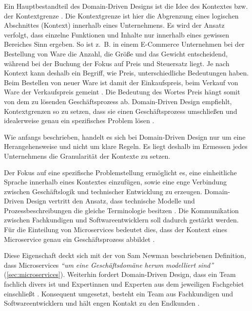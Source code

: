 Ein Hauptbestandteil des Domain-Driven Designs ist die Idee des Kontextes bzw. der Kontextgrenze \parencite[vgl.][]{fowler_boundedContext_2014}. Die Kontextgrenze ist hier die Abgrenzung eines logischen Abschnittes (Kontext) innerhalb eines Unternehmens. Es wird der Ansatz verfolgt, dass einzelne Funktionen und Inhalte nur innerhalb eines gewissen Bereiches Sinn ergeben. So ist z.~B. in einem E-Commerce Unternehmen bei der Bestellung von Ware die Anzahl, die Größe und das Gewicht entscheidend, während bei der Buchung der Fokus auf Preis und Steuersatz liegt. Je nach Kontext kann deshalb ein Begriff, wie Preis, unterschiedliche Bedeutungen haben. Beim Bestellen von neuer Ware ist damit der Einkaufspreis, beim Verkauf von Ware der Verkaufspreis gemeint \parencite[vgl.][S. 24 ff.]{evans_domain-driven_2003}. Die Bedeutung des Wortes Preis hängt somit von dem zu lösenden Geschäftsprozess ab. Domain-Driven Design empfiehlt, Kontextgrenzen so zu setzen, dass sie einen Geschäftsprozess umschließen und idealerweise genau ein spezifisches Problem lösen \parencite[vgl.][Kap. 4.3]{wolff_microservices_2018}.

Wie anfangs beschrieben, handelt es sich bei Domain-Driven Design nur um eine Herangehensweise und nicht um klare Regeln. Es liegt deshalb im Ermessen jedes Unternehmens die Granularität der Kontexte zu setzen.

Der Fokus auf eine spezifische Problemstellung ermöglicht es, eine einheitliche Sprache innerhalb eines Kontextes einzufügen, sowie eine enge Verbindung zwischen Geschäftslogik und technischer Entwicklung zu erzeugen. Domain-Driven Design vertritt den Ansatz, dass technische Modelle und Prozessbeschreibungen die gleiche Terminologie besitzen \parencite[vgl.][S. 24 ff.]{evans_domain-driven_2003}. Die Kommunikation zwischen Fachkundigen und Softwareentwicklern soll dadurch gestärkt werden. Für die Einteilung von Microservices bedeutet dies, dass der Kontext eines Microservice genau ein Geschäftsprozess abbildet \parencites[vgl.][Kap. 4.3]{wolff_microservices_2018}[vgl.][Kap. 4]{newman_monolith_2019}.

Diese Eigenschaft deckt sich mit der von Sam Newman beschriebenen Definition, dass Microservices \textit{\enquote{um eine Geschäftsdomäne herum modelliert sind}} (\cref{sec:microservices}). Weiterhin fordert Domain-Driven Design, dass ein Team fachlich divers ist und Expertinnen und Experten aus dem jeweiligen Fachgebiet einschließt \parencite[vgl.][S. 32 ff.]{evans_domain-driven_2003}. 
Konsequent umgesetzt, besteht ein Team aus Fachkundigen und Softwareentwicklern und hält engen Kontakt zu den Endkunden \parencites[vgl.][Kap. 4.3]{wolff_microservices_2018}.


